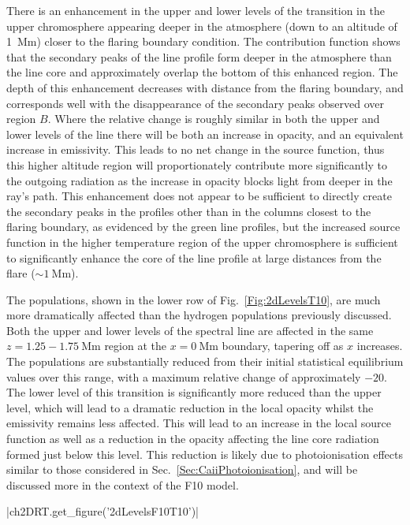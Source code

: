 There is an enhancement in the upper and lower levels of the \Ha{} transition in the upper chromosphere appearing deeper in the atmosphere (down to an altitude of \SI{1}{\mega\metre}) closer to the flaring boundary condition.
The contribution function shows that the secondary peaks of the \Ha{} line profile form deeper in the atmosphere than the line core and approximately overlap the bottom of this enhanced region.
The depth of this enhancement decreases with distance from the flaring boundary, and corresponds well with the disappearance of the secondary peaks observed over region $B$.
Where the relative change is roughly similar in both the upper and lower levels of the \Ha{} line there will be both an increase in opacity, and an equivalent increase in emissivity.
This leads to no net change in the source function, thus this higher altitude region will proportionately contribute more significantly to the outgoing radiation as the increase in opacity blocks light from deeper in the ray's path.
This enhancement does not appear to be sufficient to directly create the secondary peaks in the \Ha{} profiles other than in the columns closest to the flaring boundary, as evidenced by the green line profiles, but the increased source function in the higher temperature region of the upper chromosphere is sufficient to significantly enhance the core of the line profile at large distances from the flare ($\sim\SI{1}{\mega\metre}$).

The \Caii{} populations, shown in the lower row of Fig.~\ref{Fig:2dLevelsT10}, are much more dramatically affected than the hydrogen populations previously discussed.
Both the upper and lower levels of the \CaLine{} spectral line are affected in the same $z=1.25-\SI{1.75}{\mega\metre}$ region at the $x=\SI{0}{\mega\metre}$ boundary, tapering off as $x$ increases.
The populations are substantially reduced from their initial statistical equilibrium values over this range, with a maximum relative change of approximately $-20$.
The lower level of this transition is significantly more reduced than the upper level, which will lead to a dramatic reduction in the local opacity whilst the emissivity remains less affected.
This will lead to an increase in the local source function as well as a reduction in the opacity affecting the line core radiation formed just below this level.
This reduction is likely due to photoionisation effects similar to those considered in Sec.~\ref{Sec:CaiiPhotoionisation}, and will be discussed more in the context of the F10 model.

\py[2DRT]|ch2DRT.get_figure('2dLevelsF10T10')|

